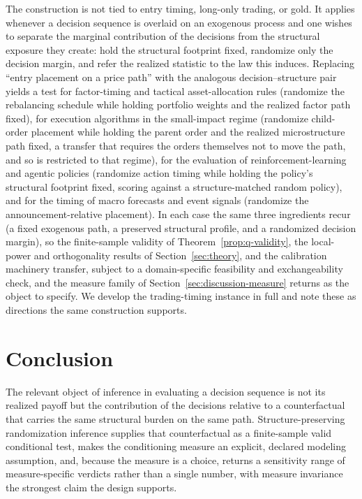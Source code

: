 \documentclass[preprint,12pt]{elsarticle}
\theoremstyle{definition}
\begin{document}
The construction is not tied to entry timing, long-only trading, or gold. It
applies whenever a decision sequence is overlaid on an exogenous process and one wishes to
separate the marginal contribution of the decisions from the structural exposure they
create: hold the structural footprint fixed, randomize only the decision margin, and refer
the realized statistic to the law this induces. Replacing ``entry placement on a price
path'' with the analogous decision--structure pair yields a test for factor-timing and
tactical asset-allocation rules (randomize the rebalancing schedule while holding portfolio
weights and the realized factor path fixed), for execution algorithms in the small-impact
regime (randomize child-order placement while holding the parent order and the realized
microstructure path fixed, a transfer that requires the orders themselves not to move the
path, and so is restricted to that regime), for the evaluation of reinforcement-learning and
agentic policies (randomize action timing while holding the policy's structural footprint
fixed, scoring against a structure-matched random policy), and for the timing of macro
forecasts and event signals (randomize the announcement-relative placement). In each case
the same three ingredients recur (a fixed exogenous path, a preserved structural profile,
and a randomized decision margin), so the finite-sample validity of
Theorem~\ref{prop:q-validity}, the local-power and orthogonality results of
Section~\ref{sec:theory}, and the calibration machinery transfer, subject to a domain-specific
feasibility and exchangeability check, and the measure family of
Section~\ref{sec:discussion-measure} returns as the object to specify. We develop the trading-timing instance in full and note these
as directions the same construction supports.


\section{Conclusion}

The relevant object of inference in evaluating a decision sequence is not its
realized payoff but the contribution of the decisions relative to a counterfactual
that carries the same structural burden on the same path. Structure-preserving
randomization inference supplies that counterfactual as a finite-sample valid
conditional test, makes the conditioning measure an explicit, declared modeling assumption, and, because
the measure is a choice, returns a sensitivity range of measure-specific verdicts rather
than a single number, with measure invariance the strongest claim the design supports.
\end{document}
